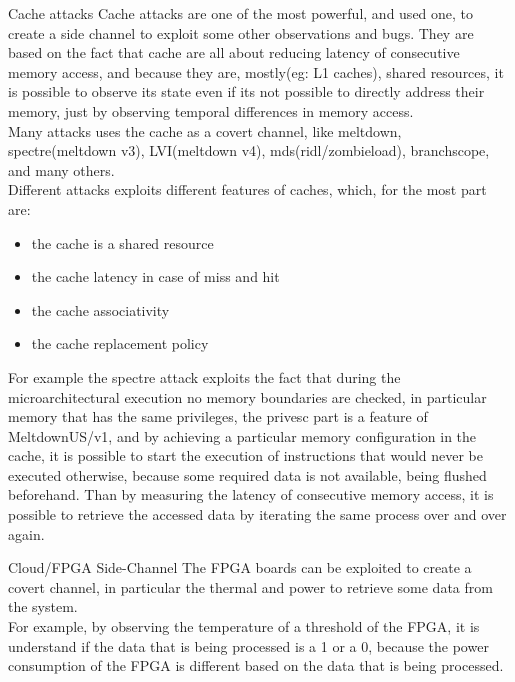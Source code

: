 \begin{section}{Cache attacks}
  Cache attacks are one of the most powerful, and used one, to create a side channel to exploit some
  other observations and bugs. They are based on the fact that cache are all about reducing latency
  of consecutive memory access, and because they are, mostly(eg: L1 caches), shared resources, it is
  possible to observe its state even if its not possible to directly address their memory, just by
  observing temporal differences in memory access.\\
  Many attacks uses the cache as a covert channel, like meltdown, spectre(meltdown v3), LVI(meltdown
  v4), mds(ridl/zombieload), branchscope, and many others.\\
  Different attacks exploits different features of caches, which, for the most part are:
  \begin{itemize}
    \item the cache is a shared resource
    \item the cache latency in case of miss and hit
    \item the cache associativity
    \item the cache replacement policy
  \end{itemize}
  For example the spectre attack exploits the fact that during the microarchitectural execution no
  memory boundaries are checked, in particular memory that has the same privileges, the privesc part
  is a feature of MeltdownUS/v1, and by achieving a particular memory configuration in the cache, it
  is possible to start the execution of instructions that would never be executed otherwise, because
  some required data is not available, being flushed beforehand. Than by measuring the latency of
  consecutive memory access, it is possible to retrieve the accessed data by iterating the same
  process over and over again.

\end{section}

\begin{section}{Cloud/FPGA Side-Channel}
  The FPGA boards can be exploited to create a covert channel, in particular the thermal and power
  to retrieve some data from the system.\\
  For example, by observing the temperature of a threshold of the FPGA, it is understand if the data
  that is being processed is a 1 or a 0, because the power consumption of the FPGA is different
  based on the data that is being processed.
\end{section}

